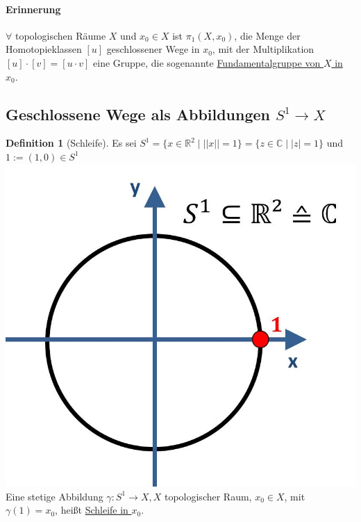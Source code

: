 \documentclass[a4paper,11pt,notitlepage]{report}
\theoremstyle{remark}
\theoremstyle{definition}
\newtheorem{definition}{Definition}[chapter]
\newcommand{\R}{{\ensuremath{\mathbb{R}}}}
\newcommand{\C}{{\ensuremath{\mathbb{C}}}}
\begin{document}

\paragraph{Erinnerung} $\forall$ topologischen Räume $X$ und $x_0 \in X$ ist $\pi_1(X,x_0)$, die Menge der Homotopieklassen $[u]$ geschlossener Wege in $x_0$, mit der Multiplikation $[u] \cdot [v] = [u \cdot v]$ eine Gruppe, die sogenannte \underline{Fundamentalgruppe von $X$ in $x_0$}.
\newpage
\subsection{Geschlossene Wege als Abbildungen $S^1 \rightarrow X$}
\begin{definition}[Schleife]
	Es sei $S^1 = \{x \in \R^2 \mid ||x|| = 1\} = \{z \in \C \mid |z| = 1\}$
	und $1:= (1,0) \in S^1$ \newline \includegraphics[scale=0.3]{images/S1_mit_1.jpg}\newline
	Eine stetige Abbildung $\gamma \colon S^1 \rightarrow X, X$ topologischer Raum, $x_0 \in X$, mit $\gamma(1)=x_0$, heißt \underline{Schleife in $x_0$}.

\end{definition}
\end{document}
